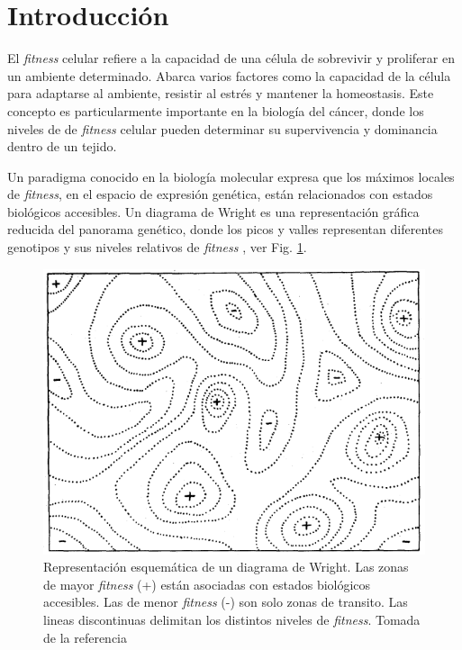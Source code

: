 \chapter*{Introducción} \label{intro}
\onehalfspacing

El \textit{fitness} celular refiere a la capacidad de una célula de sobrevivir y proliferar en un ambiente determinado. Abarca varios factores como la capacidad de la célula para adaptarse al ambiente, resistir al estrés y mantener la homeostasis. Este concepto es particularmente importante en la biología del cáncer, donde los niveles de de \textit{fitness} celular pueden determinar su supervivencia y dominancia dentro de un tejido.

Un paradigma conocido en la biología molecular expresa que los máximos locales de \textit{fitness}, en el espacio de expresión genética, están relacionados con estados biológicos accesibles. Un diagrama de Wright es una representación gráfica reducida del panorama genético, donde los picos y valles representan diferentes genotipos y sus niveles relativos de \textit{fitness} \cite{wright1932roles}, ver Fig. \ref{fig:wrightDiagram}. 

\begin{figure}[ht]
	\centering
	\includegraphics[scale=0.64]{figures/wright_diagram.png}
	\caption{Representación esquemática de un diagrama de Wright. Las zonas de mayor \textit{fitness} (+) están asociadas con estados biológicos accesibles. Las de menor \textit{fitness} (-) son solo zonas de transito. Las lineas discontinuas delimitan los distintos niveles de \textit{fitness}. Tomada de la referencia \cite{wright1932roles}}
	\label{fig:wrightDiagram}
\end{figure}

